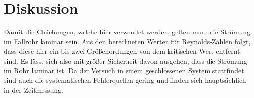 \section{Diskussion}
Damit die Gleichungen, welche hier verwendet werden, gelten muss die Strömung im Fallrohr laminar sein.
Aus den berechneten Werten für Reynolds-Zahlen folgt, dass diese hier ein bis zwei Größenordungen von dem kritischen Wert entfernt sind.
Es lässt sich also mit größer Sicherheit davon ausgehen, dass die Strömung im Rohr laminar ist.
Da der Versuch in einem geschlossenen System stattfindet sind auch die systematischen Fehlerquellen gering und finden sich hauptsächlich in der Zeitmessung.
